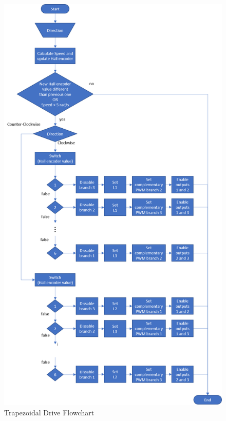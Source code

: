 \vfill
\begin{figure}[htbp]
\centering
\includegraphics[width=\textwidth]{Images/flowcharts/trapezoidal_drive.png} 
\caption[Trapezoidal Drive Flowchart]{Trapezoidal Drive Flowchart}
\label{fig:trap_flow}
\end{figure}
\vfill

